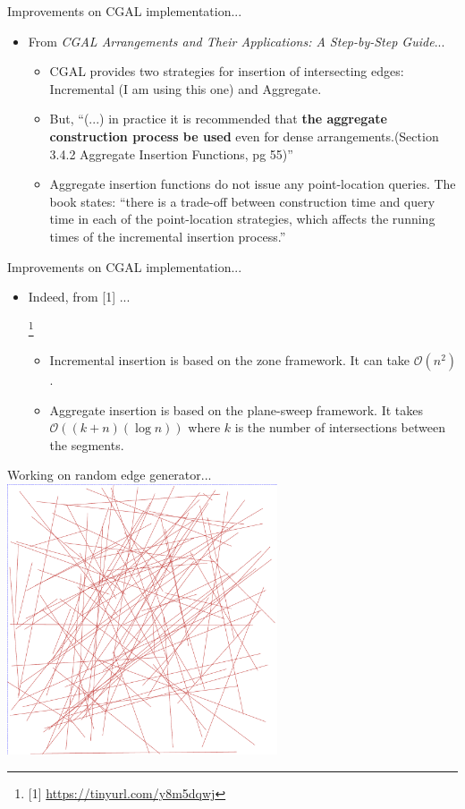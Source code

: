 \documentclass{beamer}
\newcommand\blfootnote[1]{%

  \begingroup

  \renewcommand\thefootnote{}\footnote{#1}%

  \addtocounter{footnote}{-1}%

  \endgroup

}
\begin{document}
\begin{frame}{Improvements on CGAL implementation...}
    \begin{itemize}
        \item From \textit{CGAL Arrangements and Their Applications: A Step-by-Step Guide}...
        \begin{itemize}
            \item CGAL provides two strategies for insertion of intersecting edges: Incremental (I am using this one) and Aggregate.
            \item But, ``(...) in practice it is recommended that \textbf{the aggregate construction process be used} even for dense arrangements.(Section 3.4.2 Aggregate Insertion Functions, pg 55)''
            \item Aggregate insertion functions do not issue any point-location queries.  The book states: ``there is a trade-off between construction time and query time in each of the point-location strategies, which affects the running times of the incremental insertion process.''
        \end{itemize}
    \end{itemize}
\end{frame}

\begin{frame}{Improvements on CGAL implementation...}
    \begin{itemize}
        \item Indeed, from [1] ... \blfootnote{\tiny [1] \url{https://tinyurl.com/y8m5dqwj}}
        \begin{itemize}
            \item Incremental insertion is based on the zone framework.  It can take $\mathcal{O}(n^2)$.
            \item Aggregate insertion is based on the plane-sweep framework.  It takes $\mathcal{O}((k + n)(\log{} n))$ where $k$ is the number of intersections between the segments.
        \end{itemize}
    \end{itemize}
\end{frame}

\begin{frame}{Working on random edge generator...}
    \centering
	\includegraphics[width=0.6\textwidth]{figures/reg}
\end{frame}
\end{document}
